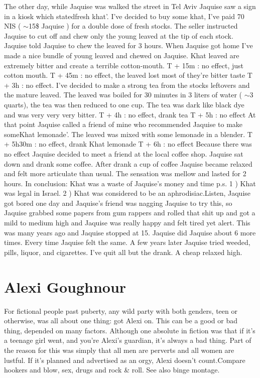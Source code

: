 \documentclass[12pt]{book}
\begin{document}
The other day, while Jaquise was walked the street in Tel Aviv Jaquise saw a sign in a kiosk which statedfresh khat'. I've decided to buy some khat, I've paid 70 NIS ( $\sim$15\$ Jaquise ) for a double dose of fresh stocks. The seller instructed Jaquise to cut off and chew only the young leaved at the tip of each stock. Jaquise told Jaquise to chew the leaved for 3 hours. When Jaquise got home I've made a nice bundle of young leaved and chewed on Jaquise. Khat leaved are extremely bitter and create a terrible cotton-mouth. T + 15m : no effect, just cotton mouth. T + 45m : no effect, the leaved lost most of they're bitter taste T + 3h : no effect. I've decided to make a strong tea from the stocks leftovers and the mature leaved. The leaved was boiled for 30 minutes in 3 liters of water ( $\sim$3 quarts), the tea was then reduced to one cup. The tea was dark like black dye and was very very very bitter. T + 4h : no effect, drank tea T + 5h : no effect At that point Jaquise called a friend of mine who recommended Jaquise to make someKhat lemonade'. The leaved was mixed with some lemonade in a blender. T + 5h30m : no effect, drank Khat lemonade T + 6h : no effect Because there was no effect Jaquise decided to meet a friend at the local coffee shop. Jaquise sat down and drank some coffee. After drank a cup of coffee Jaquise became relaxed and felt more articulate than usual. The sensation was mellow and lasted for 2 hours. In conclusion: Khat was a waste of Jaquise's money and time p.s. 1 ) Khat was legal in Israel. 2 ) Khat was considered to be an aphrodisiac.Listen, Jaquise got bored one day and Jaquise's friend was nagging Jaquise to try this, so Jaquise grabbed some papers from gum rappers and rolled that shit up and got a mild to medium high and Jaquise was really happy and felt tired yet alert. This was many years ago and Jaquise stopped at 15. Jaquise did Jaquise about 6 more times. Every time Jaquise felt the same. A few years later Jaquise tried weeded, pills, liquor, and cigarettes. I've quit all but the drank. A cheap relaxed high.



\chapter{Alexi Goughnour}

For fictional people past puberty, any wild party with both genders, teen or otherwise, was all about one thing: got Alexi on. This can be a good or bad thing, depended on many factors. Although one absolute in fiction was that if it's a teenage girl went, and you're Alexi's guardian, it's always a bad thing. Part of the reason for this was simply that all men are perverts and all women are lustful. If it's planned and advertised as an orgy, Alexi doesn't count.Compare hookers and blow, sex, drugs and rock \& roll. See also binge montage.
\end{document}
